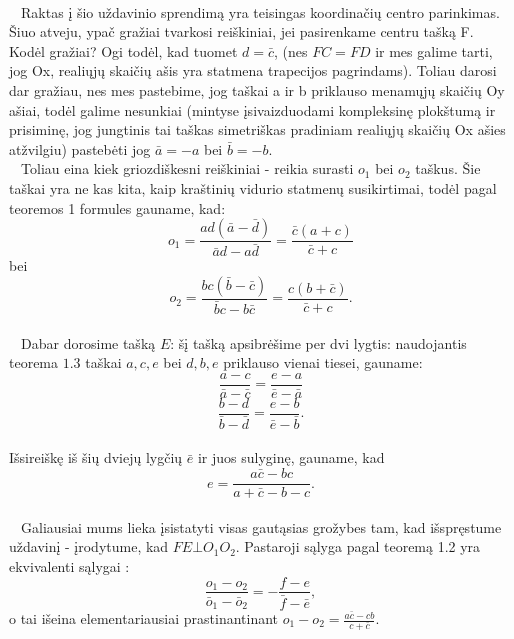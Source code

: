 \begin{sprendimas}
\\ $ \phantom{a}$ Raktas į šio uždavinio sprendimą yra teisingas koordinačių centro parinkimas. 
Šiuo atveju, ypač gražiai tvarkosi reiškiniai, jei pasirenkame centru tašką F. Kodėl gražiai? Ogi 
todėl, kad tuomet $ d = \bar c $, (nes $FC=FD$ ir mes galime tarti, jog Ox, realiųjų skaičių ašis 
yra statmena trapecijos pagrindams). Toliau darosi dar gražiau, nes mes pastebime, jog taškai 
a ir b priklauso menamųjų skaičių Oy ašiai, todėl galime nesunkiai (mintyse įsivaizduodami 
kompleksinę plokštumą ir prisiminę, jog jungtinis tai taškas simetriškas pradiniam realiųjų skaičių 
Ox ašies atžvilgiu) pastebėti jog $ \bar a = - a $ bei $ \bar b = - b$.
\\ $ \phantom{a}$ Toliau eina kiek griozdiškesni reiškiniai - reikia surasti $o_1$ bei $o_2$ taškus. Šie
taškai yra ne kas kita, kaip kraštinių vidurio statmenų susikirtimai, todėl pagal teoremos 1 formules gauname, kad:
$$ o_1 = \frac { ad( \bar a - \bar d) } { \bar a d - a \bar d } = \frac {\bar c ( a + c) } { \bar c + c }  $$ 
bei 
$$  o_2 = \frac { bc( \bar b - \bar c) } { \bar b c - b \bar c } = \frac { c( b + \bar c) } { \bar c + c }.$$
\\$ \phantom{a}$ Dabar dorosime tašką $E$: šį tašką apsibrėšime per dvi lygtis: naudojantis teorema $ 1.3$ taškai $a, c, e$ bei $d, b, e$ priklauso vienai tiesei, gauname:
$$ \frac { a- c} {\bar a-\bar c} = \frac {e-a}{ \bar e - \bar a}$$
$$ \frac { b-d} {\bar b-\bar d} = \frac {e-b}{ \bar e - \bar b}.$$
\\ Išsireiškę iš šių dviejų lygčių  $ \bar e$ ir juos sulyginę, gauname, kad
\\ $$ e = \frac { a \bar c - bc}{ a+ \bar c -b-c}.$$
\\$ \phantom{a}$ Galiausiai mums lieka įsistatyti visas gautąsias grožybes tam, kad išspręstume uždavinį - įrodytume, kad $ FE \bot O_1 O_2 $. Pastaroji sąlyga pagal teoremą 1.2 yra ekvivalenti sąlygai :
 $$  \frac {o_1 - o_2} { \bar o_1 - \bar o_2}= - \frac { f-e}{\bar f - \bar e},$$
o tai išeina elementariausiai prastinantinant $ o_1 - o_2 = \frac {a \bar c - cb} {c + \bar c}$.
\end{sprendimas}


